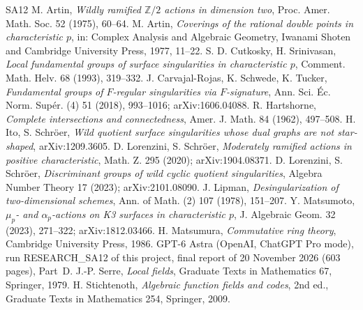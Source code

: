 \documentclass[11pt,a4paper]{article}
\theoremstyle{definition}
\begin{document}
\begin{thebibliography}{SA12}
 M. Artin, \emph{Wildly ramified $\mathbb Z/2$ actions
in dimension two}, Proc. Amer. Math. Soc. 52 (1975), 60--64.
 M. Artin, \emph{Coverings of the rational double points
in characteristic $p$}, in: Complex Analysis and Algebraic Geometry,
Iwanami Shoten and Cambridge University Press, 1977, 11--22.
 S. D. Cutkosky, H. Srinivasan, \emph{Local fundamental
groups of surface singularities in characteristic $p$}, Comment. Math. Helv.
68 (1993), 319--332.
 J. Carvajal-Rojas, K. Schwede, K. Tucker,
\emph{Fundamental groups of $F$-regular singularities via $F$-signature},
Ann. Sci. \'Ec. Norm. Sup\'er. (4) 51 (2018), 993--1016; arXiv:1606.04088.
 R. Hartshorne, \emph{Complete intersections and
connectedness}, Amer. J. Math. 84 (1962), 497--508.
 H. Ito, S. Schr\"oer, \emph{Wild quotient surface
singularities whose dual graphs are not star-shaped}, arXiv:1209.3605.
 D. Lorenzini, S. Schr\"oer, \emph{Moderately ramified
actions in positive characteristic}, Math. Z. 295 (2020); arXiv:1904.08371.
 D. Lorenzini, S. Schr\"oer, \emph{Discriminant groups of
wild cyclic quotient singularities}, Algebra Number Theory 17 (2023);
arXiv:2101.08090.
 J. Lipman, \emph{Desingularization of two-dimensional
schemes}, Ann. of Math. (2) 107 (1978), 151--207.
 Y. Matsumoto, \emph{$\mu_p$- and $\alpha_p$-actions on K3
surfaces in characteristic $p$}, J. Algebraic Geom. 32 (2023), 271--322;
arXiv:1812.03466.
 H. Matsumura, \emph{Commutative ring theory}, Cambridge
University Press, 1986.
 GPT-6 Astra (OpenAI, ChatGPT Pro mode), run
RESEARCH\_SA12 of this project, final report of 20 November 2026 (603 pages),
Part~D.
 J.-P. Serre, \emph{Local fields}, Graduate Texts in
Mathematics 67, Springer, 1979.
 H. Stichtenoth, \emph{Algebraic function fields and
codes}, 2nd ed., Graduate Texts in Mathematics 254, Springer, 2009.
\end{thebibliography}
\end{document}

